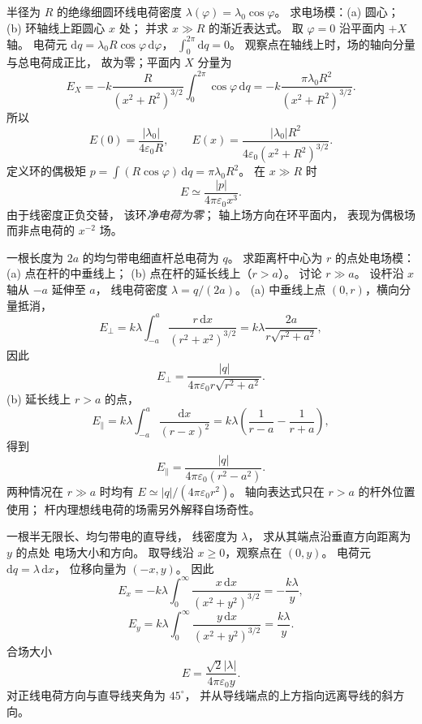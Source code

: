 半径为 $R$ 的绝缘细圆环线电荷密度
$\lambda(\varphi)=\lambda_0\cos\varphi$。
求电场模：(a) 圆心；
(b) 环轴线上距圆心 $x$ 处；
并求 $x\gg R$ 的渐近表达式。
\exsolution
取 $\varphi=0$ 沿平面内 $+X$ 轴。
电荷元
$\mathrm dq=\lambda_0R\cos\varphi\,\mathrm d\varphi$，
$\int_0^{2\pi}\mathrm dq=0$。
观察点在轴线上时，场的轴向分量与总电荷成正比，
故为零；平面内 $X$ 分量为
\[
E_X=-k\frac{R}{(x^2+R^2)^{3/2}}
\int_0^{2\pi}\cos\varphi\,\mathrm dq
=-k\frac{\pi\lambda_0R^2}{(x^2+R^2)^{3/2}}.
\]
所以
\[
\boxed{E(0)=\frac{|\lambda_0|}{4\varepsilon_0R}},
\qquad
\boxed{E(x)=
\frac{|\lambda_0|R^2}{4\varepsilon_0(x^2+R^2)^{3/2}}}.
\]
定义环的偶极矩
$p=\int(R\cos\varphi)\,\mathrm dq
=\pi\lambda_0R^2$。
在 $x\gg R$ 时
\[
\boxed{E\simeq\frac{|p|}{4\pi\varepsilon_0x^3}}.
\]
\excheck 由于线密度正负交替，
该环\emph{净电荷为零}；
轴上场方向在环平面内，
表现为偶极场而非点电荷的 $x^{-2}$ 场。

一根长度为 $2a$ 的均匀带电细直杆总电荷为 $q$。
求距离杆中心为 $r$ 的点处电场模：
(a) 点在杆的中垂线上；
(b) 点在杆的延长线上（$r>a$）。
讨论 $r\gg a$。
\exsolution
设杆沿 $x$ 轴从 $-a$ 延伸至 $a$，
线电荷密度 $\lambda=q/(2a)$。
(a) 中垂线上点 $(0,r)$，横向分量抵消，
\[
E_\perp=k\lambda\int_{-a}^{a}
\frac{r\,\mathrm dx}{(r^2+x^2)^{3/2}}
=k\lambda\frac{2a}{r\sqrt{r^2+a^2}},
\]
因此
\[
\boxed{E_\perp=\frac{|q|}
{4\pi\varepsilon_0r\sqrt{r^2+a^2}}}.
\]
(b) 延长线上 $r>a$ 的点，
\[
E_\parallel=k\lambda\int_{-a}^{a}
\frac{\mathrm dx}{(r-x)^2}
=k\lambda\left(\frac1{r-a}-\frac1{r+a}\right),
\]
得到
\[
\boxed{E_\parallel=\frac{|q|}
{4\pi\varepsilon_0(r^2-a^2)}}.
\]
两种情况在 $r\gg a$ 时均有
$\boxed{E\simeq |q|/(4\pi\varepsilon_0r^2)}$。
\excheck 轴向表达式只在 $r>a$ 的杆外位置使用；
杆内理想线电荷的场需另外解释自场奇性。

一根半无限长、均匀带电的直导线，
线密度为 $\lambda$，
求从其端点沿垂直方向距离为 $y$ 的点处
电场大小和方向。
\exsolution
取导线沿 $x\ge0$，观察点在 $(0,y)$。
电荷元 $\mathrm dq=\lambda\,\mathrm dx$，
位移向量为 $(-x,y)$。
因此
\[
E_x=-k\lambda\int_0^\infty
\frac{x\,\mathrm dx}{(x^2+y^2)^{3/2}}
=-\frac{k\lambda}{y},
\]
\[
E_y=k\lambda\int_0^\infty
\frac{y\,\mathrm dx}{(x^2+y^2)^{3/2}}
=\frac{k\lambda}{y}.
\]
合场大小
\[
\boxed{E=\frac{\sqrt2|\lambda|}
{4\pi\varepsilon_0y}}.
\]
\excheck 对正线电荷方向与直导线夹角为 $45^\circ$，
并从导线端点的上方指向远离导线的斜方向。

